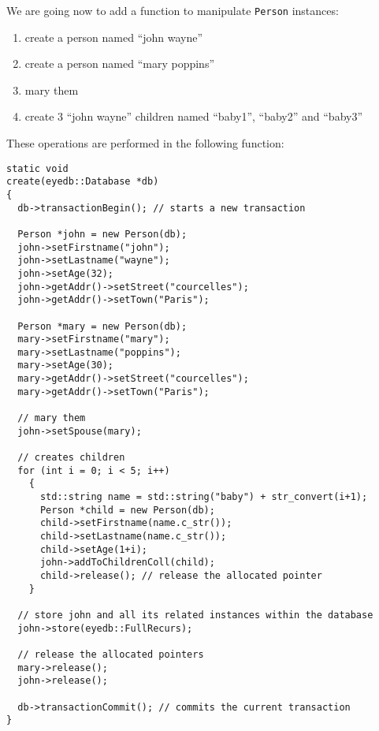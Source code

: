 We are going now to add a function to manipulate \texttt{Person} instances:
\begin{enumerate}
\item create a person named ``john wayne''
\item create a person named ``mary poppins''
\item mary them
\item create 3 ``john wayne'' children named ``baby1'', ``baby2'' and ``baby3''
\end{enumerate}

These operations are performed in the following function:
\verbsize \begin{verbatim}
static void
create(eyedb::Database *db)
{
  db->transactionBegin(); // starts a new transaction

  Person *john = new Person(db);
  john->setFirstname("john");
  john->setLastname("wayne");
  john->setAge(32);
  john->getAddr()->setStreet("courcelles");
  john->getAddr()->setTown("Paris");

  Person *mary = new Person(db);
  mary->setFirstname("mary");
  mary->setLastname("poppins");
  mary->setAge(30);
  mary->getAddr()->setStreet("courcelles");
  mary->getAddr()->setTown("Paris");

  // mary them
  john->setSpouse(mary);

  // creates children
  for (int i = 0; i < 5; i++)
    {
      std::string name = std::string("baby") + str_convert(i+1);
      Person *child = new Person(db);
      child->setFirstname(name.c_str());
      child->setLastname(name.c_str());
      child->setAge(1+i);
      john->addToChildrenColl(child);
      child->release(); // release the allocated pointer
    }

  // store john and all its related instances within the database
  john->store(eyedb::FullRecurs);

  // release the allocated pointers
  mary->release();
  john->release();

  db->transactionCommit(); // commits the current transaction
}
\end{verbatim}
\normalsize

